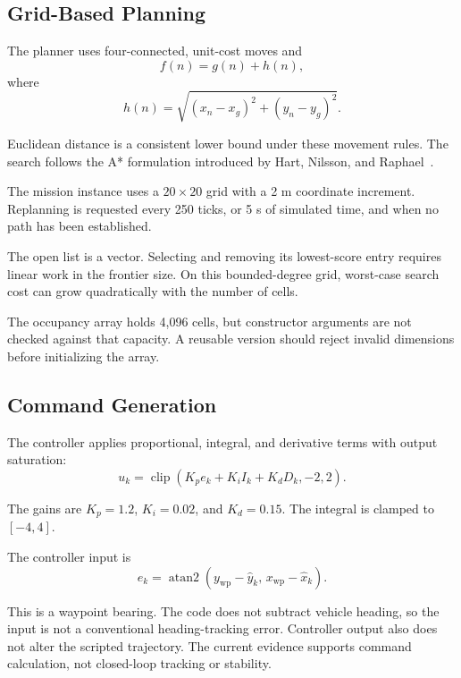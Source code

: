 \documentclass[conference]{IEEEtran}
\begin{document}
\subsection{Grid-Based Planning}

The planner uses four-connected, unit-cost moves and
\begin{equation}
f(n)=g(n)+h(n),
\end{equation}
where
\begin{equation}
h(n)=
\sqrt{(x_n-x_g)^2+(y_n-y_g)^2}.
\end{equation}

Euclidean distance is a consistent lower bound under these
movement rules. The search follows the A* formulation
introduced by Hart, Nilsson, and Raphael~\cite{astar}.

The mission instance uses a $20\times20$ grid with a 2 m
coordinate increment. Replanning is requested every
250 ticks, or 5 s of simulated time, and when no path
has been established.

The open list is a vector. Selecting and removing its
lowest-score entry requires linear work in the frontier
size. On this bounded-degree grid, worst-case search
cost can grow quadratically with the number of cells.

The occupancy array holds 4,096 cells, but constructor
arguments are not checked against that capacity.
A reusable version should reject invalid dimensions
before initializing the array.

\subsection{Command Generation}

The controller applies proportional, integral, and
derivative terms with output saturation:
\begin{equation}
u_k =
\operatorname{clip}
\left(K_pe_k+K_iI_k+K_dD_k,-2,2\right).
\end{equation}

The gains are $K_p=1.2$, $K_i=0.02$, and $K_d=0.15$.
The integral is clamped to $[-4,4]$.

The controller input is
\begin{equation}
e_k =
\operatorname{atan2}
(y_{\mathrm{wp}}-\hat y_k,\,
 x_{\mathrm{wp}}-\hat x_k).
\end{equation}

This is a waypoint bearing. The code does not subtract
vehicle heading, so the input is not a conventional
heading-tracking error. Controller output also does not
alter the scripted trajectory. The current evidence
supports command calculation, not closed-loop tracking
or stability.
\end{document}
